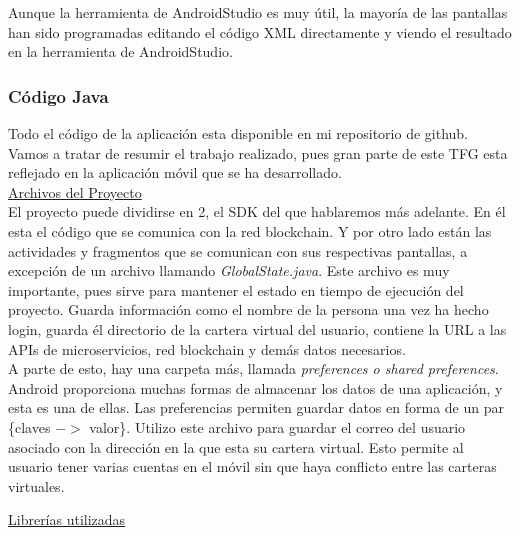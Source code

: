 Aunque la herramienta de AndroidStudio es muy útil, la mayoría de las pantallas han sido programadas editando el código XML directamente y viendo el resultado en la herramienta de AndroidStudio.

\subsubsection{Código Java}

Todo el código de la aplicación esta disponible en mi repositorio de github\cite{forgis98}. Vamos a tratar de resumir el trabajo realizado, pues gran parte de este TFG esta reflejado en la aplicación móvil que se ha desarrollado. \\

\uline{Archivos del Proyecto} \\

El proyecto puede dividirse en 2, el SDK del que hablaremos más adelante. En él esta el código que se comunica con la red blockchain. Y por otro lado están las actividades y fragmentos que se comunican con sus respectivas pantallas, a excepción de un archivo llamando \emph{GlobalState.java}. Este archivo es muy importante, pues sirve para mantener el estado en tiempo de ejecución del proyecto. Guarda información como el nombre de la persona una vez ha hecho login, guarda él directorio de la cartera virtual del usuario, contiene la URL a las APIs de microservicios, red blockchain y demás datos necesarios. \\

A parte de esto, hay una carpeta más, llamada \emph{preferences o shared preferences}. Android proporciona muchas formas de almacenar los datos de una aplicación, y esta es una de ellas. Las preferencias permiten guardar datos en forma de un par \{claves $->$ valor\}. Utilizo este archivo para guardar el correo del usuario asociado con la dirección en la que esta su cartera virtual. Esto permite al usuario tener varias cuentas en el móvil sin que haya conflicto entre las carteras virtuales. 

\uline{Librerías utilizadas} \\


